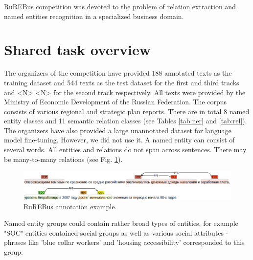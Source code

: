\documentclass{dialogue}
\begin{document}
RuREBus competition was devoted to the problem of relation extraction and named entities recognition in a specialized business domain.

\section{Shared task overview}
The organizers of the competition have provided 188 annotated texts as the training dataset and 544 texts as the test dataset for the first and third tracks and <N> <N> for the second track respectively. All texts were provided by the Ministry of Economic Development of the Russian Federation. The corpus consists of various regional and strategic plan reports. There are in total 8 named entity classes and 11 semantic relation classes (see Tables \ref{tab:ner} and \ref{tab:rel}). The organizers have also provided a large unannotated dataset for language model fine-tuning. However, we did not use it. A named entity can consist of several words. All entities and relations do not span across sentences. There may be many-to-many relations (see Fig. \ref{fig:brat}).

\begin{figure}[thb]
	\centering
	\includegraphics[scale=0.4]{pics/brat}
	\caption{RuREBus annotation example.}
	\label{fig:brat}
\end{figure}

 
Named entity groups could contain rather broad types of entities, for example "SOC" entities contained social groups as well as various social attributes - phrases like 'blue collar workers' and 'housing accessibility' corresponded to this group.
\end{document}

